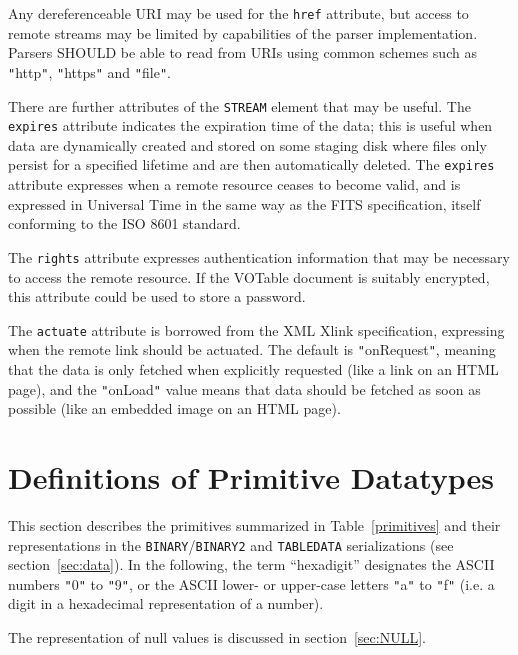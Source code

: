 \documentclass[11pt,a4paper]{ivoa}
\def\Aref#1{section~\ref{#1}}
\def\Tref#1{Table~\ref{#1}}
\let\fg=\color
\def\attr#1{{\tt{\fg{DarkRed}#1}}}
\def\elem#1{{\tt{\fg{DarkRed}#1}}}
\def\literalvalue#1{{\tt"}{{\fg{DarkPurple}#1}}{\tt"}}
\begin{document}
Any dereferenceable URI may be used for the \attr{href} attribute,
but access to remote streams may be limited
by capabilities of the parser implementation.
Parsers SHOULD be able to read from URIs
using common schemes such as
\literalvalue{http}, \literalvalue{https} and \literalvalue{file}.

There are further attributes of the {\elem{STREAM}}
element that may be useful. The {\attr{expires}}
attribute indicates the expiration time of the data;
this is useful when data are dynamically created and stored
on some staging disk where files only persist for a specified
lifetime and are then automatically deleted.
The {\attr{expires}}
attribute expresses when a remote resource ceases to become valid,
and is expressed in Universal Time in the same way as the FITS
specification, itself conforming to the ISO 8601 standard.

The {\attr{rights}}
attribute expresses authentication information that may be necessary
to access the remote resource. If  the VOTable document is suitably
encrypted, this attribute could be used to store a password.

The {\attr{actuate}}
attribute is borrowed from the XML Xlink specification, expressing
when the remote link should be actuated. The default is {\literalvalue{onRequest}},
meaning that the data is only fetched when explicitly requested (like
a link on an HTML page), and the {\literalvalue{onLoad}}
value means that data should be fetched as soon as possible (like an
embedded image on an HTML page).

\section{Definitions of Primitive Datatypes}
\label{sec:datatypes}

This section describes the primitives summarized in
\Tref{primitives}
and their representations in the \elem{BINARY}/\elem{BINARY2}
and \elem{TABLEDATA} serializations
(see \Aref{sec:data}).
In the following, the term ``hexadigit'' designates the ASCII numbers
\literalvalue{0} to \literalvalue{9}, or the ASCII lower- or upper-case letters
\literalvalue{a} to \literalvalue{f} (i.e. a digit in a hexadecimal representation
of a number).

The representation of null values is discussed in \Aref{sec:NULL}.
\end{document}
